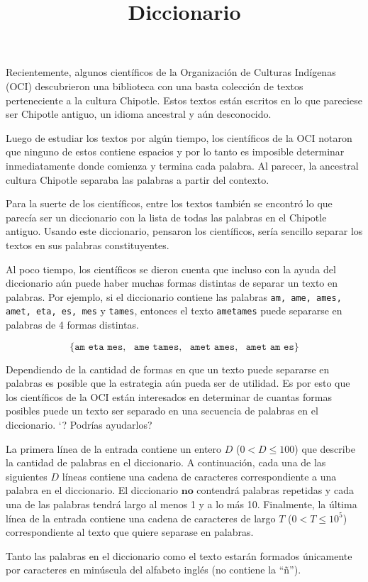 \documentclass{oci}
\title{Diccionario}
\begin{document}
\begin{problemDescription}
Recientemente, algunos científicos de la Organización de Culturas Indígenas
(OCI) descubrieron una biblioteca con una basta colección de
textos perteneciente a la cultura Chipotle.
Estos textos están escritos en lo que pareciese ser Chipotle antiguo, un idioma
ancestral y aún desconocido.

Luego de estudiar los textos por algún tiempo, los científicos de la OCI notaron
que ninguno de estos contiene espacios y por lo tanto es imposible determinar
inmediatamente donde comienza y termina cada palabra.
Al parecer, la ancestral cultura Chipotle separaba las palabras a partir del
contexto.

Para la suerte de los científicos, entre los textos también se encontró lo que
parecía ser un diccionario con la lista de todas las palabras en el Chipotle
antiguo.
Usando este diccionario, pensaron los científicos, sería sencillo separar los
textos en sus palabras constituyentes.

Al poco tiempo, los científicos se dieron cuenta que incluso con la ayuda del
diccionario aún puede haber muchas formas distintas de separar un texto en
palabras.
Por ejemplo, si el diccionario contiene las palabras \texttt{am, ame, ames,
  amet, eta, es, mes} y  \texttt{tames}, entonces el texto \texttt{ametames}
puede separarse en palabras de 4 formas distintas.

$$\{\texttt{am eta mes},\ \ \  \texttt{ame tames},\ \ \  \texttt{amet ames},\ \ \  \texttt{amet am es}  \}$$


Dependiendo de la cantidad de formas en que un texto puede separarse en palabras
es posible que la estrategia aún pueda ser de utilidad.
Es por esto que los científicos de la OCI están interesados en determinar de
cuantas formas posibles puede un texto ser separado en una secuencia de palabras
en el diccionario.
`? Podrías ayudarlos?
\end{problemDescription}

\begin{inputDescription}
  La primera línea de la entrada contiene un entero $D$ ($0 < D \leq 100$) que
  describe la cantidad de palabras en el diccionario.
  A continuación, cada una de las siguientes $D$ líneas contiene una cadena de
  caracteres correspondiente a una palabra en el diccionario.
  El diccionario $\textbf{no}$ contendrá palabras repetidas y cada una de las
  palabras tendrá largo al menos 1 y a lo más 10.
  Finalmente, la última línea de la entrada contiene una cadena de caracteres de
  largo $T$ ($0 < T \leq 10^5$) correspondiente al texto que quiere separase en palabras.

  Tanto las palabras en el diccionario como el texto estarán formados
  únicamente por caracteres en minúscula del alfabeto inglés (no contiene la ``ñ'').
\end{inputDescription}
\end{document}
